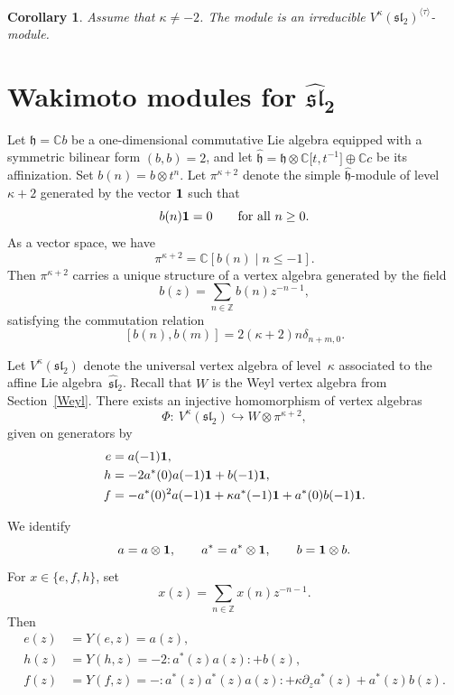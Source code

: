 \documentclass[pdftex]{sigma}
\numberwithin{equation}{section}
\newtheorem{Corollary}[Theorem]{Corollary}
\theoremstyle{definition}
\newcommand{\1}{\textbf{1}}
\begin{document}
\begin{Corollary}
Assume that $\kappa \ne -2$. The module  is an irreducible
$V^{\kappa}(\mathfrak{sl}_{2})^{\langle \tau \rangle}$-module.
\end{Corollary}

\section[Wakimoto modules for widehat sl\_2]{Wakimoto modules for $\boldsymbol{\widehat{\mathfrak{sl}}_{2}}$}
\label{section-Wakimoto-1}

Let $\mathfrak{h} = \mathbb{C}b$ be a one-dimensional commutative Lie algebra equipped with a symmetric bilinear form
$(b,b) = 2$, and let $\widehat{\mathfrak{h}} = \mathfrak{h} \otimes \mathbb{C}\bigl[t,t^{-1}\bigr] \oplus \mathbb{C}c$
be its affinization.
Set $b(n) = b \otimes t^{n}$.
Let $\pi^{\kappa+2}$ denote the simple $\widehat{\mathfrak{h}}$-module of level $\kappa+2$ generated by the vector ${\bf 1}$ such that
\[
 b(n) {\bf 1} = 0 \qquad \text{for all } n \ge 0.
\]
As a vector space, we have
\[
 \pi^{\kappa+2} = \mathbb{C}[b(n) \mid n \le -1].
\]
Then $\pi^{\kappa+2}$ carries a unique structure of a vertex algebra generated by the field
\[
 b(z) = \sum_{n \in \mathbb{Z}} b(n) z^{-n-1},
\]
satisfying the commutation relation
\[
 [b(n), b(m)] = 2(\kappa + 2) n \delta_{n+m,0}.
\]

Let $V^{\kappa}(\mathfrak{sl}_{2})$ denote the universal vertex algebra of level~$\kappa$ associated to the affine Lie algebra~$\widehat{\mathfrak{sl}}_{2}$.
Recall that $W$ is the Weyl vertex algebra from Section~\ref{Weyl}.
There exists an injective homomorphism of vertex algebras
\[
 \Phi \colon \ V^{\kappa}(\mathfrak{sl}_{2}) \hookrightarrow W \otimes \pi^{\kappa+2},
\]
given on generators by
\begin{align*}
 e &= a(-1){\bf 1}, \\
 h &= -2 a^{*}(0)a(-1){\bf 1} + b(-1){\bf 1}, \\
 f &= -a^{*}(0)^{2} a(-1){\bf 1} + \kappa a^{*}(-1){\bf 1} + a^{*}(0) b(-1){\bf 1}.
\end{align*}


We identify
\[
 a = a \otimes {\bf 1}, \qquad
 a^{*} = a^{*} \otimes {\bf 1}, \qquad
 b = {\bf 1} \otimes b.
\]
For $x \in \{ e, f, h \}$, set
\[
 x(z) = \sum_{n \in \mathbb{Z}} x(n) z^{-n-1}.
\]
Then
\begin{align*}
 e(z) &= Y(e,z) = a(z), \\
 h(z) &= Y(h,z) = -2 {:}a^{*}(z)a(z){:} + b(z), \\
 f(z) &= Y(f,z) = -{:}a^{*}(z)a^{*}(z)a(z){:} + \kappa \partial_{z}a^{*}(z) + a^{*}(z)b(z).
\end{align*}
\end{document}
